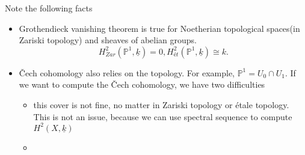 \documentclass[../main.tex]{subfiles}
\begin{document}
\begin{remark}
 Note the following facts
 \begin{itemize}
 \item Grothendieck vanishing theorem is true for Noetherian topological spaces(in Zariski topology) and sheaves of abelian groups. 
 $$H^{2}_{Zar}(\mathbb{P}^{1},\underline{k})=0, H^{2}_{ét}(\mathbb{P}^{1}, \underline{k})\cong k.$$
 \item Čech cohomology also relies on the topology. For example, $\mathbb{P}^{1}=U_{0}\cap U_{1}$. If we want to compute the Čech cohomology, we have two difficulties
 \begin{itemize}
 \item this cover is not fine, no matter in Zariski topology or étale topology. This is not an issue, because we can use spectral sequence to compute $H^{2}(X,\underline{k})$
 \item 
 \end{itemize}
 \end{itemize}
\end{remark}
\end{document}
